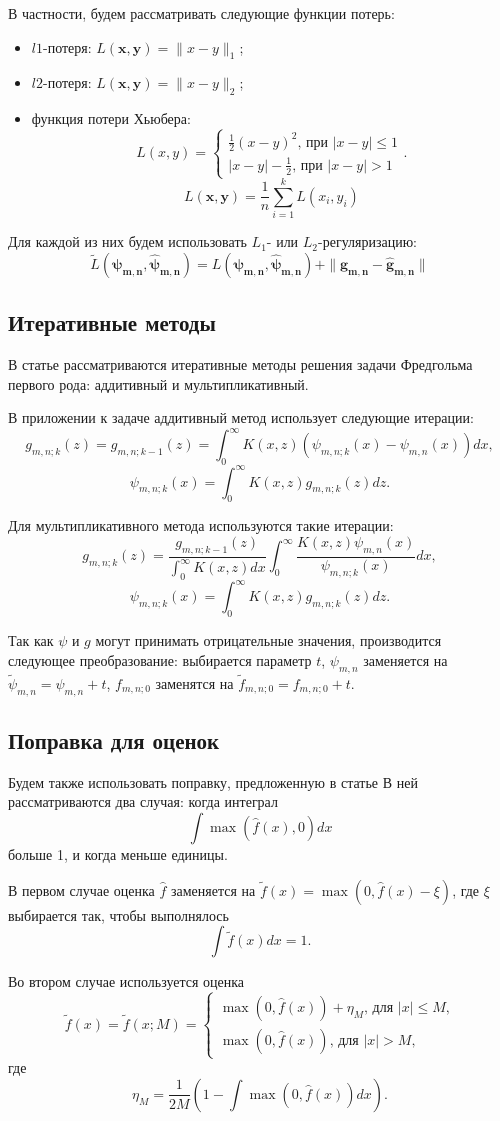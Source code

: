\documentclass[../paper.tex]{subfiles}
\begin{document}
В частности, будем рассматривать следующие функции потерь:
\begin{itemize}
\item $l1$-потеря: $L(\bm{x}, \bm{y}) = \| x - y \|_1$;
\item $l2$-потеря: $L(\bm{x}, \bm{y}) = \| x - y \|_2$;
\item функция потери Хьюбера:
  \[
    L(x, y) =
    \begin{cases}
      \frac{1}{2} (x-y)^2 \text{, при $|x-y| \leqslant 1$} \\
      |x-y| - \frac{1}{2} \text{, при $|x-y| > 1$}
    \end{cases}.
  \]
  \[
    L(\bm{x}, \bm{y}) = \frac{1}{n} \sum_{i=1}^k L(x_i, y_i)
  \]
\end{itemize}

Для каждой из них будем использовать $L_1$- или $L_2$-регуляризацию:
\[
  \tilde{L}(\bm{\psi_{m,n}}, \bm{\hat{\psi}_{m,n}}) = L(\bm{\psi_{m,n}}, \bm{\hat{\psi}_{m,n}}) + \| \bm{g_{m,n}} - \bm{\hat{g}_{m,n}} \|
\]

\subsection{Итеративные методы}
В статье \cite{fredholm-integrals} рассматриваются итеративные методы решения задачи Фредгольма
первого рода: аддитивный и мультипликативный.

В приложении к задаче аддитивный метод использует следующие итерации:
\[
  g_{m,n;k}(z) = g_{m,n;k-1}(z) = \int_0^\infty K(x, z) (\psi_{m,n;k}(x) - \psi_{m,n}(x)) dx
,\]
\[
  \psi_{m,n;k}(x) = \int_0^\infty K(x, z) g_{m,n;k}(z) dz
.\]

Для мультипликативного метода используются такие итерации:
\[
  g_{m,n;k}(z) = \frac{g_{m,n;k-1}(z)}{\int_{0}^\infty K(x, z) dx} \int_{0}^\infty \frac{K(x, z) \psi_{m,n}(x)}{\psi_{m,n;k}(x)} dx
,\]
\[
  \psi_{m,n;k}(x) = \int_0^\infty K(x, z) g_{m,n;k}(z) dz
.\]

Так как $\psi$ и $g$ могут принимать отрицательные значения, производится
следующее преобразование: выбирается параметр $t$, $\psi_{m,n}$ заменяется
на $\tilde{\psi}_{m,n} = \psi_{m,n} + t$, $f_{m,n;0}$ заменятся на
$\tilde{f}_{m,n;0} = f_{m,n;0} + t$.
%
\subsection{Поправка для оценок}
Будем также использовать поправку, предложенную в статье \cite{correction-of-density-estimation}
В ней рассматриваются два случая: когда интеграл
\[
  \int \max(\hat{f}(x), 0) dx
\]
больше 1, и когда меньше единицы.

В первом случае оценка $\hat{f}$ заменяется на $\tilde{f}(x) = \max(0, \hat{f}(x) - \xi)$,
где $\xi$ выбирается так, чтобы выполнялось
\[
  \int \tilde{f}(x) dx = 1
.\]

Во втором случае используется оценка
\[
  \tilde{f}(x) = \tilde{f}(x; M) =
  \begin{cases}
    \max(0, \hat{f}(x)) + \eta_M \text{, для $|x| \leqslant M$,} \\
    \max(0, \hat{f}(x)) \text{, для $|x| > M$,}
  \end{cases}
\]
где
\[
  \eta_M = \frac{1}{2M} \left( 1 - \int \max(0, \hat{f}(x)) dx \right)
.\]
\end{document}
